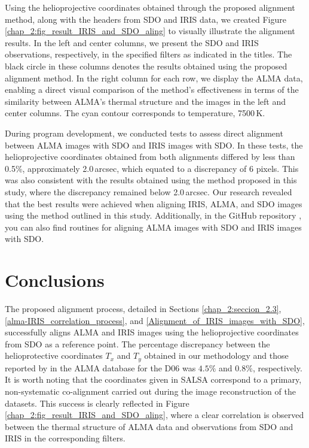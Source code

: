 \documentclass[a4paper,alpha-refs]{eSpectra}
\begin{document}
Using the helioprojective coordinates obtained through the proposed alignment method, along with the headers from SDO and IRIS data, we created Figure \ref{chap_2:fig_result_IRIS_and_SDO_aling} to visually illustrate the alignment results. In the left and center columns, we present the SDO and IRIS observations, respectively, in the specified filters as indicated in the titles.  The black circle in these columns denotes the results obtained using the proposed alignment method. In the right column for each row, we display the ALMA data,  enabling a direct visual comparison of the method's effectiveness in terms of the similarity between ALMA's thermal structure and the images in the left and center columns. The cyan contour corresponds to temperature, 7500\,K.


During program development, we conducted tests to assess direct alignment between ALMA images with SDO and IRIS images with SDO. In these tests,   the helioprojective coordinates obtained from both alignments differed by less than 0.5\%, approximately 2.0\,arcsec, which equated to a discrepancy of 6 pixels. This was also consistent with the results obtained using the method proposed in this study, where the discrepancy remained below 2.0\,arcsec. Our research revealed that the best results were achieved when aligning IRIS, ALMA, and SDO images using the method outlined in this study. Additionally, in the GitHub repository \cite{gibhub_reporsitory_alignment}, you can also find routines for aligning ALMA images with SDO and IRIS images with SDO.

 

\section{Conclusions}
The proposed alignment process, detailed in   Sections \ref{chap_2:seccion_2.3}, \ref{alma-IRIS_correlation_process}, and \ref{Alignment_of_IRIS_images_with_SDO},
successfully aligns ALMA and IRIS images using the helioprojective coordinates from SDO as a reference point. The percentage discrepancy between the helioprotective coordinates $T_x$ and $T_y$ obtained in our methodology and those reported by \cite{SALSA_guia} in the ALMA database for the D06 was $4.5\%$ and $0.8\%$, respectively. It is worth noting that the coordinates given in SALSA correspond to a primary, non-systematic co-alignment carried out during the image reconstruction of the datasets. This success is clearly reflected in Figure \ref{chap_2:fig_result_IRIS_and_SDO_aling}, where a clear correlation is observed between the thermal structure of ALMA data and observations from SDO and IRIS in the corresponding filters.
\end{document}
